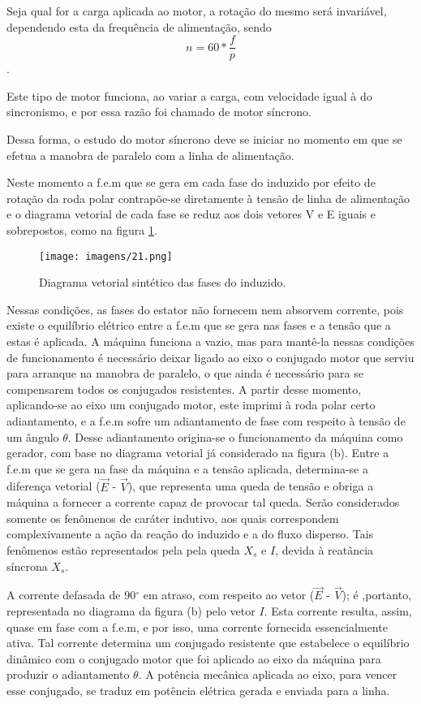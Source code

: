Seja qual for a carga aplicada ao motor, a rotação do mesmo será invariável, dependendo esta da frequência de alimentação, sendo $$n = 60 * \frac{f}{p}$$.

Este tipo de motor funciona, ao variar a carga, com velocidade igual à do sincronismo, e por essa razão foi chamado de motor síncrono.

Dessa forma, o estudo do motor síncrono deve se iniciar no momento em que se efetua a manobra de paralelo com a linha de alimentação.

Neste momento a f.e.m que se gera em cada fase do induzido por efeito de rotação da roda polar contrapõe-se diretamente à tensão de linha de alimentação e o diagrama vetorial de cada fase se reduz aos dois vetores V e E iguais e sobrepostos, como na figura \ref{fig:21}.

\begin{figure}[ht!]
\center 
\texttt{[image: imagens/21.png]}\label{fig:21}
\caption{Diagrama vetorial sintético das fases do induzido.}
\end{figure}

Nessas condições, as fases do estator não fornecem nem absorvem corrente, pois existe o equilíbrio elétrico entre a f.e.m que se gera nas fases e a tensão que a estas é aplicada. A máquina funciona a vazio, mas para mantê-la nessas condições de funcionamento é necessário deixar ligado ao eixo o conjugado motor que serviu para arranque na manobra de paralelo, o que ainda é necessário para se compensarem todos os conjugados resistentes. A partir desse momento, aplicando-se ao eixo um conjugado motor, este imprimi à roda polar certo adiantamento, e a f.e.m sofre um adiantamento de fase com respeito à tensão de um ângulo $\theta$. Desse adiantamento origina-se o funcionamento da máquina como gerador, com base no diagrama vetorial já considerado na figura (b). Entre a f.e.m que se gera na fase da máquina e a tensão aplicada, determina-se a diferença vetorial ($\vec E$ - $\vec V$), que representa uma queda de tensão e obriga a máquina a fornecer a corrente capaz de provocar tal queda. Serão considerados somente os fenômenos de caráter indutivo, aos quais correspondem complexivamente a ação da reação do induzido e a do fluxo disperso. Tais fenômenos estão representados pela pela queda $X_s$ e $I$, devida à reatância síncrona $X_s$.

A corrente defasada de 90$^{\circ}$ em atraso, com respeito ao vetor ($\vec E$ - $\vec V$); é ,portanto, representada no diagrama da figura (b) pelo vetor $I$. Esta corrente resulta, assim, quase em fase com a f.e.m, e por isso, uma corrente fornecida essencialmente ativa. Tal corrente determina um conjugado resistente que estabelece o equilíbrio dinâmico com o conjugado motor que foi aplicado ao eixo da máquina para produzir o adiantamento $\theta$. A potência mecânica aplicada ao eixo, para vencer esse conjugado, se traduz em potência elétrica gerada e enviada para a linha.

